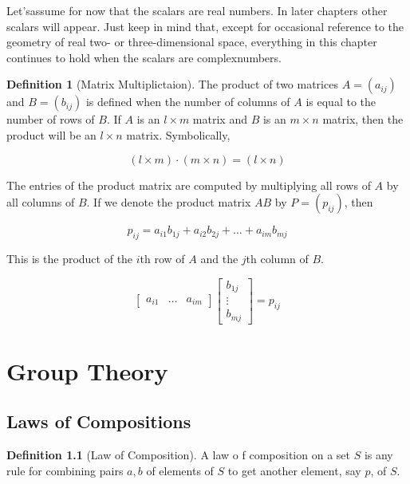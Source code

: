 \documentclass[
]{book}
\theoremstyle{definition}
\newtheorem{definition}{Definition}[chapter]
\theoremstyle{definition}
\theoremstyle{definition}
\theoremstyle{definition}
\theoremstyle{remark}
\begin{document}
Let'sassume for now that the scalars are real numbers. In later chapters other scalars will appear. Just keep in mind that, except for occasional reference to the geometry of real two- or three-dimensional space, everything in this chapter continues to hold when the scalars are complexnumbers.

\begin{definition}[Matrix Multiplictaion]
\protect\hypertarget{def:unnamed-chunk-7}{}\label{def:unnamed-chunk-7}The product of two matrices \(A = (a_{ij})\) and \(B = (b_{ij})\) is defined when the number of columns of \(A\) is equal to the number of rows of \(B\). If \(A\) is an \(l \times m\) matrix and \(B\) is an \(m \times n\) matrix, then the product will be an \(l \times n\) matrix. Symbolically,

\[(l \times m) \cdot (m \times n) = (l \times n)\]

The entries of the product matrix are computed by multiplying all rows of \(A\) by all columns of \(B\). If we denote the product matrix \(AB\) by \(P = (p_{ij})\), then

\begin{equation} \label{eq:2}
p_{ij} = a_{i1}b_{1j} + a_{i2}b_{2j} + \ldots + a_{im}b_{mj}
\end{equation}

This is the product of the \(i\)th row of \(A\) and the \(j\)th column of \(B\).

\[
\begin{bmatrix}
a_{i1} & \ldots & a_{im}
\end{bmatrix}
\begin{bmatrix}
b_{1j} \\
\vdots \\
b_{mj}
\end{bmatrix}
= p_{ij}
\]
\end{definition}

\hypertarget{group-theory}{%
\chapter{Group Theory}\label{group-theory}}

\hypertarget{laws-of-compositions}{%
\section{Laws of Compositions}\label{laws-of-compositions}}

\begin{definition}[Law of Composition]
\protect\hypertarget{def:unnamed-chunk-8}{}\label{def:unnamed-chunk-8}A law o f composition on a set \(S\) is any rule for combining pairs \(a, b\) of elements of \(S\) to get another element, say \(p\), of \(S\).
\end{definition}
\end{document}

